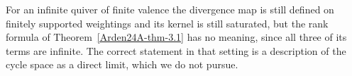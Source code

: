 \begin{remark}\label{Arden24A-rem-4.2}
\label{Arden24A-rem:infinite}
For an infinite quiver of finite valence the divergence map is still defined on finitely supported weightings and its kernel is still saturated, but the rank formula of Theorem~\ref{Arden24A-thm-3.1} has no meaning, since all three of its terms are infinite. The correct statement in that setting is a description of the cycle space as a direct limit, which we do not pursue.
\end{remark}